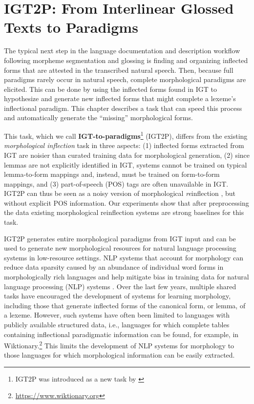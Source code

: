 \chapter{IGT2P: From Interlinear Glossed Texts to Paradigms}
\label{chap:IGT2P}


The typical next step in the language documentation and description workflow following morpheme segmentation and glossing is finding and organizing inflected forms that are attested in the transcribed natural speech. Then, because full paradigms rarely occur in natural speech, complete morphological paradigms are elicited. This can be done by using the inflected forms found in IGT to hypothesize and generate new inflected forms that might complete a lexeme's inflectional paradigm. This chapter describes a task that can speed this process and automatically generate the ``missing'' morphological forms.

This task, which we call \textbf{IGT-to-paradigms}\footnote{IGT2P was introduced as a new task by \citet{moeller_igt2p_2020}} (IGT2P), differs from the existing \textit{morphological inflection} \citep{yarowsky-wicentowski-2000-minimally,faruqui-etal-2016-morphological} task in three aspects: (1) inflected forms extracted from IGT are noisier than curated training data for morphological generation, (2) since lemmas are not explicitly identified in IGT, systems cannot be trained on typical lemma-to-form mappings and, instead, must be trained on form-to-form mappings, and (3) part-of-speech (POS) tags are often unavailable in IGT. IGT2P can thus be seen as a noisy version of morphological \textit{re}inflection \citep{cotterell-etal-2016-sigmorphon}, but without explicit POS information. Our experiments show that after preprocessing the data existing morphological reinflection systems are strong baselines for this task. 

IGT2P generates entire morphological paradigms from IGT input and can be used to generate new morphological resources for natural language processing systems in low-resource settings. NLP systems that account for morphology can reduce data sparsity caused by an abundance of individual word forms in morphologically rich languages \citep{cotterell-etal-2016-sigmorphon,cotterell-etal-2017-conll,cotterell-etal-2018-conll,mccarthy-etal-2019-sigmorphon,vylomova2020sigmorphon} and help mitigate bias in training data for natural language processing (NLP) systems \citep{zmigrod-etal-2019-counterfactual}. Over the last few years, multiple shared tasks have encouraged the development of systems for learning morphology, including those that generate inflected forms of the canonical form, or lemma, of a lexeme.  However, such systems have often been limited to languages with publicly available structured data, i.e., languages for which complete tables containing inflectional paradigmatic information can be found, for example, in Wiktionary.\footnote{\url{https://www.wiktionary.org}} This limits the development of NLP systems for morphology to those languages for which morphological information can be easily extracted. 

